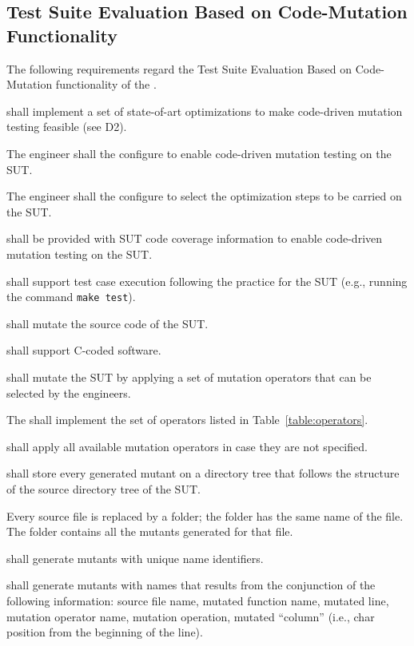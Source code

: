 

\subsection{Test Suite Evaluation Based on Code-Mutation Functionality}
\label{sec:codeDriven}

The following requirements regard the Test Suite Evaluation Based on Code-Mutation functionality of the \FAQAS.

\RQ{} \FAQAS shall implement a set of state-of-art optimizations to make code-driven mutation testing feasible (see D2).

\RQ{} The engineer shall the configure \FAQAS to enable code-driven mutation testing on the SUT.

\RQ{} The engineer shall the configure \FAQAS to select the optimization steps to be carried on the SUT.

\RQ{} \FAQAS shall be provided with SUT code coverage information to enable code-driven mutation testing on the SUT.

\RQ{} \FAQAS shall support test case execution following the practice for the SUT (e.g., running the command \texttt{make test}).

\RQ{} \FAQAS shall mutate the source code of the SUT.

\RQ{} \FAQAS shall support C-coded software.

\RQ{} \FAQAS shall mutate the SUT by applying a set of mutation operators that can be selected by the engineers.

\RQ{} The \FAQAS shall implement the set of operators listed in Table~\ref{table:operators}.



\RQ{} \FAQAS shall apply all available mutation operators in case they are not specified.

\RQ{} \FAQAS shall store every generated mutant on a directory tree that follows the structure of the source directory tree of the SUT.

\remark Every source file is replaced by a folder; the folder has the same name of the file. The folder contains all the mutants generated for that file. 

\RQ{} \FAQAS shall generate mutants with unique name identifiers.

\RQ{} \FAQAS shall generate mutants with names that results from the conjunction of the following information:
source file name, mutated function name, mutated line, mutation operator name, mutation operation, mutated ``column'' (i.e., char position from the beginning of the line).


